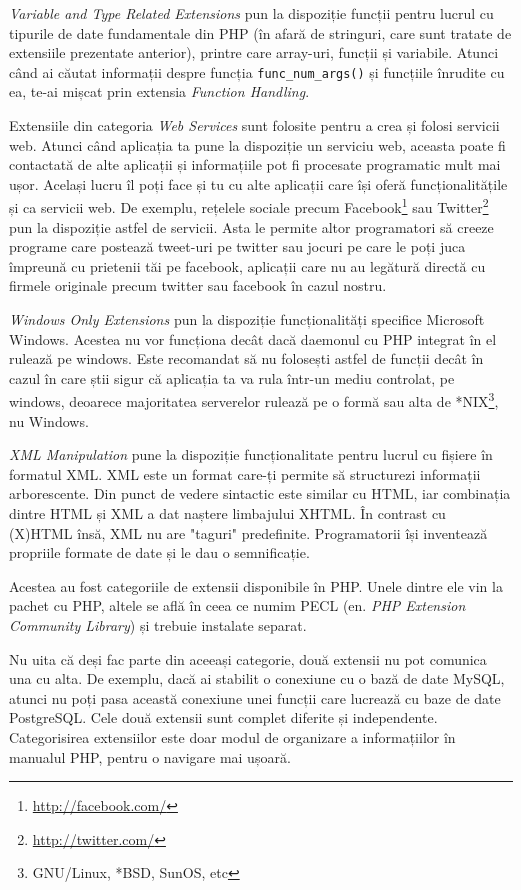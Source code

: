 \textit{Variable and Type Related Extensions} pun
la dispoziție funcții pentru lucrul cu tipurile
de date fundamentale din PHP (în afară de stringuri,
care sunt tratate de extensiile prezentate anterior), printre
care array-uri, funcții și variabile. Atunci când ai căutat
informații despre funcția \texttt{func\_num\_args()}
și funcțiile înrudite cu ea, te-ai mișcat prin extensia
\textit{Function Handling}.

Extensiile din categoria \textit{Web Services} sunt folosite
pentru a crea și folosi servicii web. Atunci când aplicația
ta pune la dispoziție un serviciu web, aceasta poate
fi contactată de alte aplicații și informațiile pot
fi procesate programatic mult mai ușor. Același lucru îl
poți face și tu cu alte aplicații care își oferă
funcționalitățile și ca servicii web. De exemplu,
rețelele sociale precum Facebook\footnote{\url{http://facebook.com/}}
sau Twitter\footnote{\url{http://twitter.com/}} pun la dispoziție
astfel de servicii. Asta le permite altor programatori să
creeze programe care postează tweet-uri pe twitter sau
jocuri pe care le poți juca împreună cu prietenii tăi
pe facebook, aplicații care nu au legătură directă
cu firmele originale precum twitter sau facebook în
cazul nostru.

\textit{Windows Only Extensions} pun la dispoziție funcționalități
specifice Microsoft Windows. Acestea nu vor funcționa decât dacă
daemonul cu PHP integrat în el rulează pe windows.
Este recomandat să nu folosești astfel de funcții
decât în cazul în care știi sigur că aplicația ta
va rula într-un mediu controlat, pe windows, deoarece
majoritatea serverelor rulează pe o formă sau alta
de *NIX\footnote{GNU/Linux, *BSD, SunOS, etc}, nu Windows.

\textit{XML Manipulation} pune la dispoziție funcționalitate
pentru lucrul cu fișiere în formatul XML. XML este un format
care-ți permite să structurezi informații arborescente. Din punct
de vedere sintactic este
similar cu HTML, iar combinația dintre HTML și XML a dat naștere
limbajului XHTML. În contrast cu (X)HTML însă, XML nu are
"taguri" predefinite. Programatorii își inventează
propriile formate de date și le dau o semnificație.

Acestea au fost categoriile de extensii disponibile în PHP.
Unele dintre ele vin la pachet cu PHP, altele se află
în ceea ce numim PECL (en. \textsl{PHP Extension Community Library})
și trebuie instalate separat.

Nu uita că deși fac parte din aceeași categorie, două extensii nu
pot comunica una cu alta. De exemplu, dacă ai stabilit o conexiune
cu o bază de date MySQL, atunci nu poți pasa această conexiune
unei funcții care lucrează cu baze de date PostgreSQL. Cele două
extensii sunt complet diferite și independente. Categorisirea
extensiilor este doar modul de organizare a informațiilor în
manualul PHP, pentru o navigare mai ușoară.


